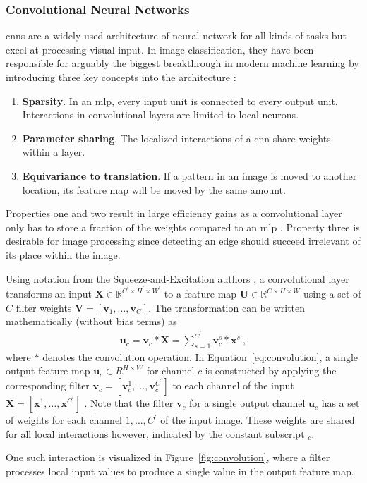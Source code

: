 \subsubsection{Convolutional Neural Networks}\label{sssec:cnns}
\glspl{cnn} \cite{lecunBackpropagationAppliedHandwritten1989} are a widely-used architecture of neural network for all kinds of tasks but excel at processing visual input. In image classification, they have been responsible for arguably the biggest breakthrough in modern machine learning \cite{krizhevskyImageNetClassificationDeep2017} by introducing three key concepts into the architecture \cite{goodfellowDeepLearning2016}:
\begin{enumerate}
    \item \textbf{Sparsity}. In an \gls{mlp}, every input unit is connected to every output unit. Interactions in convolutional layers are limited to local neurons.
    \item \textbf{Parameter sharing}. The localized interactions of a \gls{cnn} share weights within a layer.
    \item \textbf{Equivariance to translation}. If a pattern in an image is moved to another location, its feature map will be moved by the same amount. 
\end{enumerate}
Properties one and two result in large efficiency gains as a convolutional layer only has to store a fraction of the weights compared to an \gls{mlp} \cite{goodfellowDeepLearning2016}. Property three is desirable for image processing since detecting an edge should succeed irrelevant of its place within the image.

Using notation from the Squeeze-and-Excitation authors \cite{huSqueezeandExcitationNetworks2019} , a convolutional layer transforms an input $\mathbf X \in \mathbb R^{C^\prime \times H^\prime \times W^\prime}$ to a feature map $\mathbf U \in \mathbb R^{C \times H \times W}$ using a set of $C$ filter weights $\mathbf V = [\mathbf v_1, \ldots, \mathbf v_C]$. The transformation can be written mathematically (without bias terms) as 
\begin{gather}\label{eq:convolution}
    \mathbf u_c  = \mathbf v_c * \mathbf X = \sum_{s=1}^{C^\prime} \mathbf v_c^s * \mathbf x^s~,
\end{gather}
where $*$ denotes the convolution operation. In Equation~\ref{eq:convolution}, a single output feature map $\mathbf u_c \in R^{H \times W}$ for channel $c$ is constructed by applying the corresponding filter $\mathbf v_c = [\mathbf v^1_c, \ldots, \mathbf v^{C^\prime}_c]$ to each channel of the input $\mathbf X = [\mathbf x^1, \ldots, \mathbf x^{C^\prime}]$ \cite{huSqueezeandExcitationNetworks2019}. Note that the filter $\mathbf v_c$ for a single output channel $\mathbf u_c$ has a set of weights for each channel $1, \ldots, C^\prime$ of the input image. These weights are shared for all local interactions however, indicated by the constant subscript $_c$. 

One such interaction is visualized in Figure~\ref{fig:convolution}, where a filter processes local input values to produce a single value in the output feature map.

